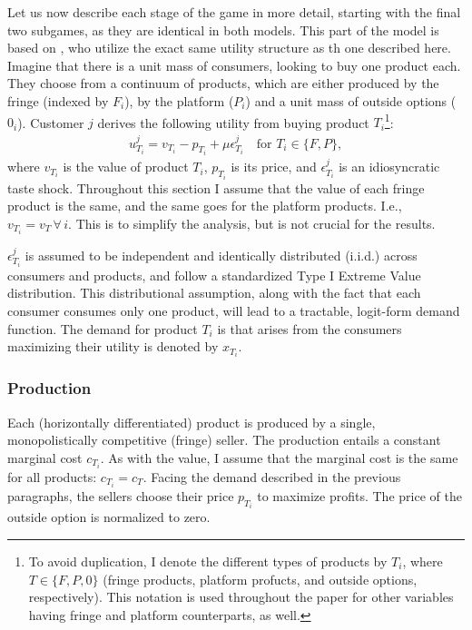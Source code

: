 \documentclass[a4paper]{article}
\begin{document}
Let us now describe each stage of the game in more detail, starting with the final two subgames, as they are identical in both models.
This part of the model is based on \textcite[]{anderson2021hybrid}, who utilize the exact same utility structure as th one described here.
Imagine that there is a unit mass of consumers, looking to buy one product each.
They choose from a continuum of products, which are either produced by the fringe (indexed by $F_i$), by the platform ($P_i$) and a unit mass of outside options ($0_i$).
Customer $j$ derives the following utility from buying product $T_i$\footnote{
    To avoid duplication, I denote the different types of products by $T_i$, where $T \in \{F, P, 0\}$ (fringe products, platform profucts, and outside options, respectively).
    This notation is used throughout the paper for other variables having fringe and platform counterparts, as well.
}:
\begin{align*}
    u_{T_i}^j = v_{T_i} - p_{T_i} + \mu\epsilon_{T_i}^j \quad \text{for } T_i \in \{F, P\},
\end{align*}
where $v_{T_i}$ is the value of product $T_i$, $p_{T_i}$ is its price, and $\epsilon_{T_i}^j$ is an idiosyncratic taste shock.
Throughout this section I assume that the value of each fringe product is the same, and the same goes for the platform products.
I.e., $v_{T_i} = v_T \, \forall\,i$.
This is to simplify the analysis, but is not crucial for the results.

$\epsilon_{T_i}^j$ is assumed to be independent and identically distributed (i.i.d.) across consumers and products, and follow a standardized Type I Extreme Value distribution.
This distributional assumption, along with the fact that each consumer consumes only one product, will lead to a tractable, logit-form demand function.
The demand for product $T_i$ is that arises from the consumers maximizing their utility is denoted by $x_{T_i}$.

\subsubsection{Production}

Each (horizontally differentiated) product is produced by a single, monopolistically competitive (fringe) seller.
The production entails a constant marginal cost $c_{T_i}$.
As with the value, I assume that the marginal cost is the same for all products: $c_{T_i} = c_T$.
Facing the demand described in the previous paragraphs, the sellers choose their price $p_{T_i}$ to maximize profits.
The price of the outside option is normalized to zero.
\end{document}

